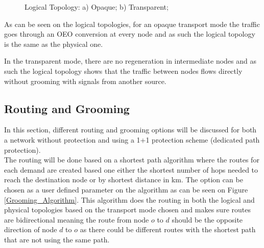 			\begin{figure}[!h]
				\centering
				
				\caption{Logical Topology: a) Opaque; b) Transparent;}								
			\end{figure}	

	As can be seen on the logical topologies, for an opaque transport mode the traffic goes through an OEO conversion at every node and as such the logical topology is the same as the physical one.
	
	In the transparent mode, there are no regeneration in intermediate nodes and as such the logical topology shows that the traffic between nodes flows directly without grooming with signals from another source.
	

	\subsection*{Routing and Grooming} \label{Routing and Grooming}
	In this section, different routing and grooming options will be discussed for both a network without protection and using a 1+1 protection scheme (dedicated path protection).\\
	The routing will be done based on a shortest path algorithm where the routes for each demand are created based one either the shortest number of hops needed to reach the destination node or by shortest distance in km. The option can be chosen as a user defined parameter on the algorithm as can be seen on Figure \ref{Grooming_Algorithm}. This algorithm does the routing in both the logical and physical topologies based on the transport mode chosen and makes sure routes are bidirectional meaning the route from node $o$ to $d$ should be the opposite direction of node $d$ to $o$ as there could be different routes with the shortest path that are not using the same path.
	
